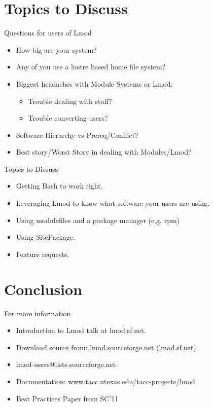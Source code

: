 \documentclass{beamer}
\begin{document}
\section{Topics to Discuss}

\begin{frame}{Questions for users of Lmod}
  \begin{itemize}
    \item How big are your system?
    \item Any of you use a lustre based home file system?
    \item Biggest headaches with Module Systems or Lmod:
      \begin{itemize}
        \item Trouble dealing with staff?
        \item Trouble converting users?
      \end{itemize}
    \item Software Hierarchy vs Prereq/Conflict?
    \item Best story/Worst Story in dealing with Modules/Lmod?
  \end{itemize}
\end{frame}

\begin{frame}{Topics to Discuss}
  \begin{itemize}
    \item Getting Bash to work right.
    \item Leveraging Lmod to know what software your users are using.
    \item Using modulefiles and a package manager (e.g. rpm)
    \item Using SitePackage.
    \item Feature requests.
  \end{itemize}
\end{frame}


\section{Conclusion}

\begin{frame}{For more information}
  \begin{itemize}
    \item Introduction to Lmod talk at lmod.sf.net.
    \item Download source from: lmod.sourceforge.net (lmod.sf.net)
    \item lmod-users@lists.sourceforge.net
    \item Documentation: www.tacc.utexas.edu/tacc-projects/lmod
    \item Best Practices Paper from SC'11
  \end{itemize}
\end{frame}
\end{document}
